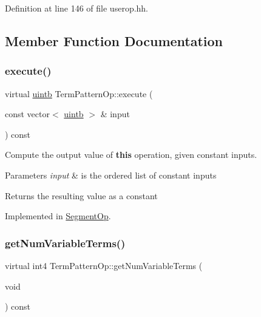 Definition at line 146 of file userop.\+hh.



\subsection{Member Function Documentation}
\mbox{\label{class_term_pattern_op_a766fd191b337e60fb882b2e7bc9b42a6}} 
\subsubsection{\texorpdfstring{execute()}{execute()}}
{\footnotesize\ttfamily virtual \mbox{\hyperlink{types_8h_a2db313c5d32a12b01d26ac9b3bca178f}{uintb}} Term\+Pattern\+Op\+::execute (\begin{DoxyParamCaption}\item[{const vector$<$ \mbox{\hyperlink{types_8h_a2db313c5d32a12b01d26ac9b3bca178f}{uintb}} $>$ \&}]{input }\end{DoxyParamCaption}) const\hspace{0.3cm}{\ttfamily [pure virtual]}}



Compute the output value of {\bfseries{this}} operation, given constant inputs. 


\begin{DoxyParams}{Parameters}
{\em input} & is the ordered list of constant inputs \\
\hline
\end{DoxyParams}
\begin{DoxyReturn}{Returns}
the resulting value as a constant 
\end{DoxyReturn}


Implemented in \mbox{\hyperlink{class_segment_op_a1857d8c2eef84b0a8c1bb7c624210c6c}{Segment\+Op}}.

\mbox{\label{class_term_pattern_op_a3978a156aa6681432b937361a2294f5d}} 
\subsubsection{\texorpdfstring{getNumVariableTerms()}{getNumVariableTerms()}}
{\footnotesize\ttfamily virtual int4 Term\+Pattern\+Op\+::get\+Num\+Variable\+Terms (\begin{DoxyParamCaption}\item[{void}]{ }\end{DoxyParamCaption}) const\hspace{0.3cm}{\ttfamily [pure virtual]}}



